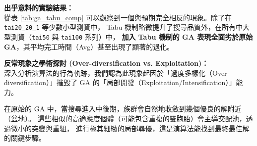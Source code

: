 \documentclass[conference]{IEEEtran}
\begin{document}
\begin{table}[htbp]
\caption{GA (OX) 與 GA (OX) 加上 Tabu 機制之結果比較}
\label{tab:ga_tabu_comp}
\centering
{}
\end{table}

\textbf{出乎意料的實驗結果：} \\
從表 \ref{tab:ga_tabu_comp} 可以觀察到一個與預期完全相反的現象。除了在 \texttt{tai20\_20\_1} 等少數小型測資中，
Tabu 機制略微提升了搜尋品質外，在所有中大型測資（\texttt{tai50} 與 \texttt{tai100} 系列）中，
\textbf{加入 Tabu 機制的 GA 表現全面劣於原始 GA}，其平均完工時間（Avg）甚至出現了顯著的退化。

\textbf{反常現象之學術探討 (Over-diversification vs. Exploitation)：} \\
深入分析演算法的行為軌跡，我們認為此現象起因於「過度多樣化（Over-diversification）」摧毀了 GA 的「局部開發（Exploitation/Intensification）」能力。

在原始的 GA 中，當搜尋進入中後期，族群會自然地收斂到幾個優良的解附近（盆地）。
這些相似的高適應度個體（可能包含重複的雙胞胎）會主導交配池，透過微小的突變與重組，
進行極其細緻的局部尋優，這是演算法能找到最終最佳解的關鍵步驟。
\end{document}
